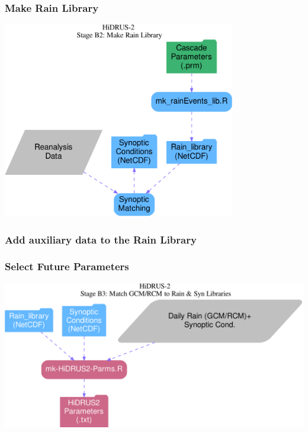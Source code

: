 \documentclass[12pt, a4paper]{extarticle}
\begin{document}
\subsubsection{Make Rain Library}
\includegraphics[width=4in]{./fig/mkRainlib.pdf}


\subsubsection{Add auxiliary data to the Rain Library}

\subsubsection{Select Future Parameters}
\includegraphics[width=6in]{./fig/selFuturePrm.pdf}
\end{document}
